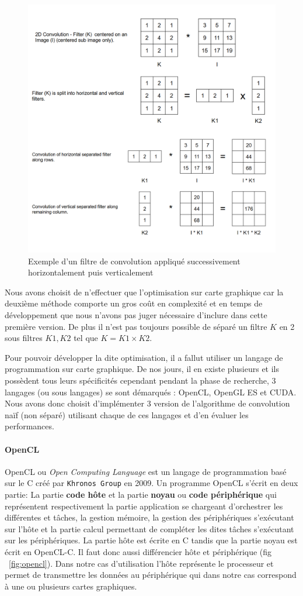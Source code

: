 \begin{figure}[H]
\includegraphics[width=0.7\linewidth]{images/separableconv}
\caption{Exemple d'un filtre de convolution appliqué successivement horizontalement puis verticalement}
\label{fig:conv:separable}
\end{figure}

Nous avons choisit de n'effectuer que l'optimisation sur carte graphique car la deuxième méthode comporte un gros coût en complexité et en temps de développement que nous n'avons pas juger nécessaire d'inclure dans cette première version. De plus il n'est pas toujours possible de séparé un filtre $K$ en 2 sous filtres $K1, K2$ tel que $K = K1 \times K2$.

Pour pouvoir développer la dite optimisation, il a fallut utiliser un langage de programmation sur carte graphique. De nos jours, il en existe plusieurs et ils possèdent tous leurs spécificités cependant pendant la phase de recherche, 3 langages (ou sous langages) se sont démarqués : OpenCL\cite{opencl}, OpenGL ES\cite{opengles} et CUDA\cite{cuda}. Nous avons donc choisit d'implémenter 3 version de l'algorithme de convolution naïf (non séparé) utilisant chaque de ces langages et d'en évaluer les performances.

\paragraph{OpenCL} OpenCL ou \emph{Open Computing Language} est un langage de programmation basé sur le C créé par \texttt{Khronos Group} en 2009.
Un programme OpenCL s'écrit en deux partie:
La partie \textbf{code hôte} et la partie \textbf{noyau} ou \textbf{code périphérique} qui représentent respectivement la partie application se chargeant d'orchestrer les différentes et tâches, la gestion mémoire, la gestion des périphériques s'exécutant sur l'hôte et la partie calcul permettant de compléter les dites tâches s'exécutant sur les périphériques. La partie hôte est écrite en C tandis que la partie noyau est écrit en OpenCL-C.
Il faut donc aussi différencier hôte et périphérique (fig ~\ref{fig:opencl}). Dans notre cas d'utilisation l'hôte représente le processeur et permet de transmettre les données au périphérique qui dans notre cas correspond à une ou plusieurs cartes graphiques.

